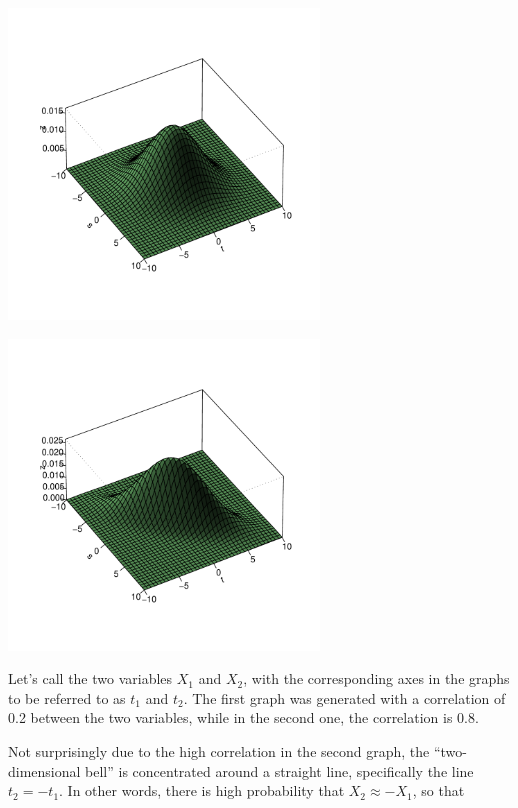 \begin{minipage}[b]{0.65\linewidth}
    \mbox{\includegraphics[width=3.25in]{Images/Rho2.pdf}} 
\end{minipage}
\hspace{0.0in}
\begin{minipage}[b]{0.65\linewidth}
    \mbox{\includegraphics[width=3.25in]{Images/Rho8.pdf}} 
\end{minipage}

Let's call the two variables $X_1$ and $X_2$, with the corresponding
axes in the graphs to be referred to as $t_1$ and $t_2$.  The first
graph was generated with a correlation of 0.2 between the two variables,
while in the second one, the correlation is 0.8.

Not surprisingly due to the high correlation in the second graph, the
``two-dimensional bell'' is concentrated around a straight line,
specifically the line $t_2 = - t_1$.  In other words, there is high
probability that $X_2 \approx -X_1$, so that  


